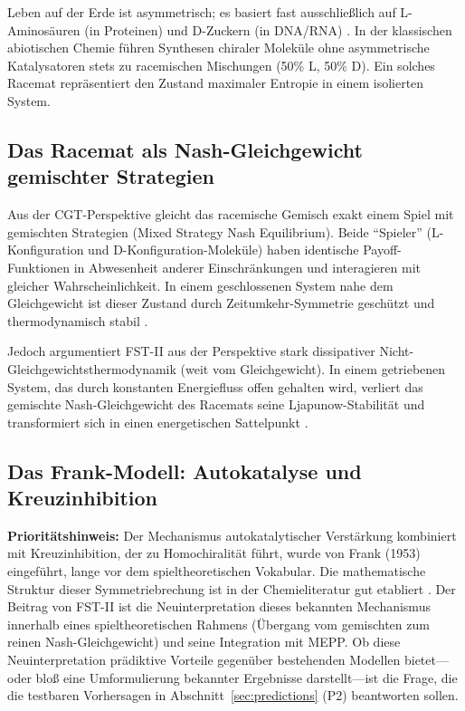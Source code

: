 \documentclass[12pt,a4paper]{article}
\theoremstyle{remark}
\begin{document}
Leben auf der Erde ist asymmetrisch; es basiert fast ausschlie\ss{}lich auf L-Aminos\"auren (in Proteinen) und D-Zuckern (in DNA/RNA) \citep{HomochiralityThermo}. In der klassischen abiotischen Chemie f\"uhren Synthesen chiraler Molek\"ule ohne asymmetrische Katalysatoren stets zu racemischen Mischungen (50\% L, 50\% D). Ein solches Racemat repr\"asentiert den Zustand maximaler Entropie in einem isolierten System.

\subsection{Das Racemat als Nash-Gleichgewicht gemischter Strategien}

Aus der CGT-Perspektive gleicht das racemische Gemisch exakt einem Spiel mit gemischten Strategien (Mixed Strategy Nash Equilibrium). Beide ``Spieler'' (L-Konfiguration und D-Konfiguration-Molek\"ule) haben identische Payoff-Funktionen in Abwesenheit anderer Einschr\"ankungen und interagieren mit gleicher Wahrscheinlichkeit. In einem geschlossenen System nahe dem Gleichgewicht ist dieser Zustand durch Zeitumkehr-Symmetrie gesch\"utzt und thermodynamisch stabil \citep{PlassonReview2007,TimeReversalSymmetry}.

Jedoch argumentiert FST-II aus der Perspektive stark dissipativer Nicht-Gleichgewichtsthermodynamik (weit vom Gleichgewicht). In einem getriebenen System, das durch konstanten Energiefluss offen gehalten wird, verliert das gemischte Nash-Gleichgewicht des Racemats seine Ljapunow-Stabilit\"at und transformiert sich in einen energetischen Sattelpunkt \citep{Frank1953,PlassonReview2007}.

\subsection{Das Frank-Modell: Autokatalyse und Kreuzinhibition}

\textbf{Priorit\"atshinweis:} Der Mechanismus autokatalytischer Verst\"arkung kombiniert mit Kreuzinhibition, der zu Homochiralit\"at f\"uhrt, wurde von Frank (1953) \citep{Frank1953} eingef\"uhrt, lange vor dem spieltheoretischen Vokabular. Die mathematische Struktur dieser Symmetriebrechung ist in der Chemieliteratur gut etabliert \citep{PlassonReview2007}. Der Beitrag von FST-II ist die Neuinterpretation dieses bekannten Mechanismus innerhalb eines spieltheoretischen Rahmens (\"Ubergang vom gemischten zum reinen Nash-Gleichgewicht) und seine Integration mit MEPP. Ob diese Neuinterpretation pr\"adiktive Vorteile gegen\"uber bestehenden Modellen bietet---oder blo\ss{} eine Umformulierung bekannter Ergebnisse darstellt---ist die Frage, die die testbaren Vorhersagen in Abschnitt~\ref{sec:predictions} (P2) beantworten sollen.
\end{document}
